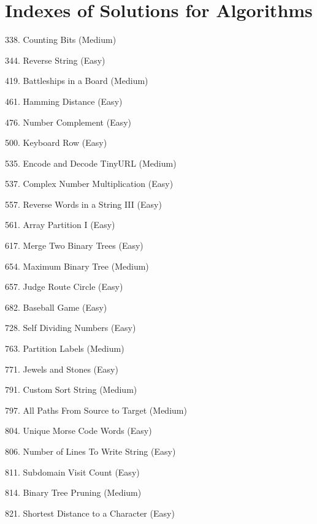 \tocless\section{Indexes of Solutions for Algorithms}
\label{sec:algo_ind}

\begin{flushleft}
338. Counting Bits (Medium)\hfill\pageref{algo:338}

344. Reverse String (Easy)\hfill\pageref{algo:344}

419. Battleships in a Board (Medium)\hfill\pageref{algo:419}

461. Hamming Distance (Easy)\hfill\pageref{algo:461}

476. Number Complement (Easy)\hfill\pageref{algo:476}

500. Keyboard Row (Easy)\hfill\pageref{algo:500}

535. Encode and Decode TinyURL (Medium)\hfill\pageref{algo:535}

537. Complex Number Multiplication (Easy)\hfill\pageref{algo:537}

557. Reverse Words in a String III (Easy)\hfill\pageref{algo:557}

561. Array Partition I (Easy)\hfill\pageref{algo:561}

617. Merge Two Binary Trees (Easy)\hfill\pageref{algo:617}

654. Maximum Binary Tree (Medium)\hfill\pageref{algo:654}

657. Judge Route Circle (Easy)\hfill\pageref{algo:657}

682. Baseball Game (Easy)\hfill\pageref{algo:682}

728. Self Dividing Numbers (Easy)\hfill\pageref{algo:728}

763. Partition Labels (Medium)\hfill\pageref{algo:763}

771. Jewels and Stones (Easy)\hfill\pageref{algo:771}

791. Custom Sort String (Medium)\hfill\pageref{algo:791}

797. All Paths From Source to Target (Medium)\hfill\pageref{algo:797}

804. Unique Morse Code Words (Easy)\hfill\pageref{algo:804}

806. Number of Lines To Write String (Easy)\hfill\pageref{algo:806}

811. Subdomain Visit Count (Easy)\hfill\pageref{algo:811}

814. Binary Tree Pruning (Medium)\hfill\pageref{algo:814}

821. Shortest Distance to a Character (Easy)\hfill\pageref{algo:821}
\end{flushleft}

\newpage

